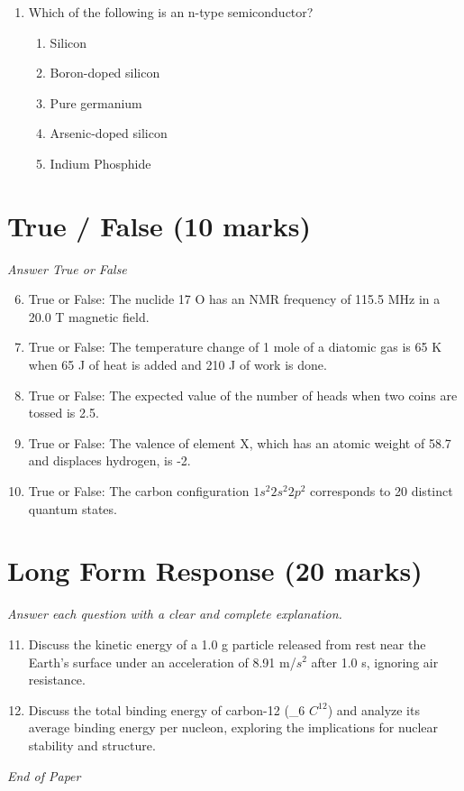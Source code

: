 \documentclass[12pt]{article}
\begin{document}
\begin{enumerate}[label=\arabic*.]
\begin{enumerate}[label=(\alph*)]
    \item O$_{2}$
    \item H$_{2}$O
    \item NH 3
\end{enumerate}
\item Which of the following is an n-type semiconductor?
\begin{enumerate}[label=(\alph*)]
    \item Silicon
    \item Boron-doped silicon
    \item Pure germanium
    \item Arsenic-doped silicon
    \item Indium Phosphide
\end{enumerate}
\end{enumerate}

\section*{True / False (10 marks)}
\textit{Answer True or False}
\begin{enumerate}[label=\arabic*.]
\setcounter{enumi}{5}
\item True or False: The nuclide 17 O has an NMR frequency of 115.5 MHz in a 20.0 T magnetic field.
\item True or False: The temperature change of 1 mole of a diatomic gas is 65 K when 65 J of heat is added and 210 J of work is done.
\item True or False: The expected value of the number of heads when two coins are tossed is 2.5.
\item True or False: The valence of element X, which has an atomic weight of 58.7 and displaces hydrogen, is -2.
\item True or False: The carbon configuration $1 s^2 2 s^2 2 p^2$ corresponds to 20 distinct quantum states.
\end{enumerate}

\section*{Long Form Response (20 marks)}
\textit{Answer each question with a clear and complete explanation.}
\begin{enumerate}[label=\arabic*.]
\setcounter{enumi}{10}
\item Discuss the kinetic energy of a 1.0 g particle released from rest near the Earth's surface under an acceleration of 8.91 m/$s^2$ after 1.0 s, ignoring air resistance.
\item Discuss the total binding energy of carbon-12 (\_6 $C^12$) and analyze its average binding energy per nucleon, exploring the implications for nuclear stability and structure.
\end{enumerate}

\vfill
\noindent\textit{End of Paper}
\end{document}
